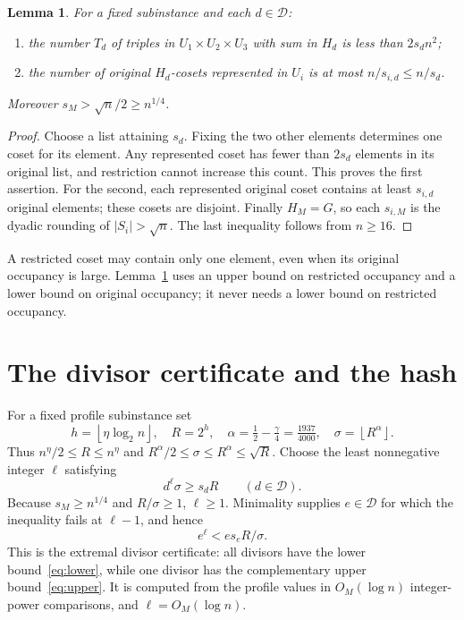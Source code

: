 \documentclass[acmsmall,11pt,nonacm,natbib=false]{acmart}
\newtheorem{lemma}[theorem]{Lemma}
\newcommand{\floor}[1]{\left\lfloor #1\right\rfloor}
\begin{document}
\begin{lemma}\label{lem:profile}
For a fixed subinstance and each $d\in\mathcal D$:
\begin{enumerate}
\item the number $T_d$ of triples in $U_1\times U_2\times U_3$ with sum in
$H_d$ is less than $2s_d n^2$;
\item the number of original $H_d$-cosets represented in $U_i$ is at most
$n/s_{i,d}\le n/s_d$.
\end{enumerate}
Moreover $s_M>\sqrt n/2\ge n^{1/4}$.
\end{lemma}
\begin{proof}
Choose a list attaining $s_d$. Fixing the two other elements determines
one coset for its element. Any represented coset has fewer than $2s_d$
elements in its original list, and restriction cannot increase this count.
This proves the first assertion. For the second, each represented original
coset contains at least $s_{i,d}$ original elements; these cosets are
disjoint. Finally $H_M=G$, so each $s_{i,M}$ is the dyadic rounding of
$|S_i|>\sqrt n$. The last inequality follows from $n\ge16$.
\end{proof}

A restricted coset may contain only one element, even when its original
occupancy is large. Lemma~\ref{lem:profile} uses an upper bound on restricted
occupancy and a lower bound on original occupancy; it never needs a lower
bound on restricted occupancy.

\section{The divisor certificate and the hash}\label{sec:certificate}

For a fixed profile subinstance set
\begin{equation}\label{eq:parameters}
 h=\floor{\eta\log_2 n},\quad R=2^h,\quad
 \alpha=\tfrac12-\tfrac\gamma4=\tfrac{1937}{4000},\quad
 \sigma=\floor{R^\alpha}.
\end{equation}
Thus $n^\eta/2\le R\le n^\eta$ and
$R^\alpha/2\le\sigma\le R^\alpha\le\sqrt R$.
Choose the least nonnegative integer $\ell$ satisfying
\begin{equation}\label{eq:lower}
 d^\ell\sigma\ge s_dR\qquad(d\in\mathcal D).
\end{equation}
Because $s_M\ge n^{1/4}$ and $R/\sigma\ge1$, $\ell\ge1$.
Minimality supplies $e\in\mathcal D$ for which the inequality fails at
$\ell-1$, and hence
\begin{equation}\label{eq:upper}
 e^\ell< e s_e R/\sigma.
\end{equation}
This is the extremal divisor certificate: all divisors have the lower
bound~\eqref{eq:lower}, while one divisor has the complementary upper
bound~\eqref{eq:upper}. It is computed from the profile values in
$O_M(\log n)$ integer-power comparisons, and $\ell=O_M(\log n)$.
\end{document}
